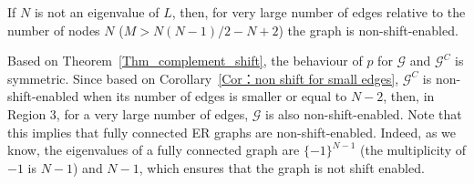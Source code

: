 \documentclass[journal]{IEEEtran}
\begin{document}
\begin{Cor}
\label{Cor:R3}
If $N$ is not an eigenvalue of $L$, then, for very large number of edges relative to the number of nodes $N$ ($M>N(N-1)/2-N+2$) the graph is non-shift-enabled.
\end{Cor}


Based on Theorem~\ref{Thm_complement_shift}, the behaviour of $p$ for $\mathcal{G}$ and $\mathcal{G}^C$ is symmetric. Since based on Corollary~\ref{Cor：non shift for small edges}, $\mathcal{G}^C$ is non-shift-enabled when its number of edges is smaller or equal to $N-2$, then, in Region 3, for a very large number of edges, $\mathcal{G}$ is also non-shift-enabled. Note that this implies that fully connected ER graphs are non-shift-enabled. Indeed, as we know, the eigenvalues of a fully connected graph are ${\{-1\}}^{N-1}$ (the multiplicity of $-1$ is $N-1$) and $N-1$, which ensures that the graph is not shift enabled.


\end{document}
